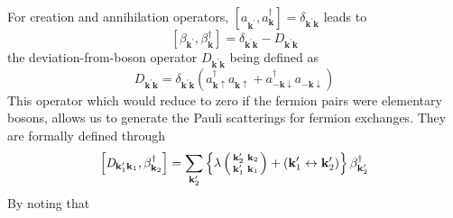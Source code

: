 \documentclass[aps,prb,superscriptaddress,twocolumn]{revtex4}
\newcommand{\vk}{\ensuremath{\mathbf{k}}}
\begin{document}
For creation and annihilation operators, $\left[a^{}_{\mathbf{k}
^{\prime}},a^{\dagger}_{\mathbf{k} {}}\right]  =\delta_{\mathbf{k} ^{\prime}%
\mathbf{k} }$ leads to 
\begin{equation}  \label{eq:betacom}
\left[\beta_{\mathbf{k} ^{\prime}},\beta^{\dagger}_{\mathbf{k} }\right] 
=\delta_{\mathbf{k} ^{\prime}\mathbf{k} }-\mathit{D} _{\mathbf{k} ^{\prime}%
\mathbf{k} }
\end{equation}
the deviation-from-boson operator $\mathit{D} _{\mathbf{k} ^{\prime}\mathbf{k%
} }$ being defined as 
\begin{equation}  \label{eq:D}
\mathit{D} _{\mathbf{k} ^{\prime}\mathbf{k} }=\delta_{\mathbf{k} ^{\prime}%
\mathbf{k} }\left(a^{\dagger}_{\mathbf{k} \uparrow}a^{}_{\mathbf{k}
\uparrow}+a^{\dagger}_{-\mathbf{k} \downarrow}a^{}_{-\mathbf{k}
\downarrow}\right) 
\end{equation}
This operator which would reduce to zero if the fermion pairs were
elementary bosons, allows us to generate the Pauli scatterings for fermion
exchanges. They are formally defined through 
\begin{equation}
\left[\mathit{D} _{\mathbf{k} ^{\prime}_1\mathbf{k} _1},\beta^{\dagger}_{%
\mathbf{k} _2}\right]  =\sum_{\mathbf{k} ^{\prime}_2}\left\{\lambda\left(%
\begin{smallmatrix}\vk'_2&\vk_2\\\vk'_1&\vk_1\end{smallmatrix}\right) 
+\left(\mathbf{k} ^{\prime}_1\leftrightarrow\mathbf{k} ^{\prime}_2\right)
\right\} \beta^{\dagger}_{\mathbf{k} ^{\prime}_2}
\end{equation}
By noting that
\end{document}
